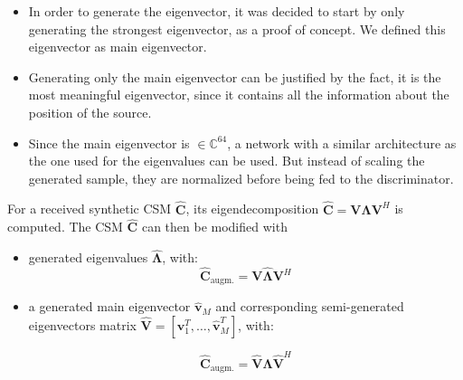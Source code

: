 \documentclass[12pt,pdftex,16x10]{elpres} %
\begin{document}
\begin{psli}
  \begin{itemize}
    \item In order to generate the eigenvector, it was decided to start by only generating the strongest eigenvector, as a proof of concept. We defined this eigenvector as main eigenvector.
    \item Generating only the main eigenvector can be justified by the fact, it is the most meaningful eigenvector, since it contains all the information about the position of the source. %
    \item Since the main eigenvector is $\in \mathbb{C}^{64}$, a network with a similar architecture as the one used for the eigenvalues can be used. But instead of scaling the generated sample, they are normalized before being fed to the discriminator. %
  \end{itemize}
\end{psli}

\begin{psli}
  
  For a received synthetic CSM $\mathbf{\hat{C}}$, its  eigendecomposition $\mathbf{\hat{C}} = \mathbf{V} \mathbf{\Lambda} \mathbf{V}^H$ is computed. The CSM $\mathbf{\hat{C}}$ can then be modified with
  
  \begin{itemize}
    \item generated eigenvalues $\hat{\mathbf{\Lambda}}$, with:
    \begin{equation}
        \mathbf{\hat{C}}_\text{augm.}  = \mathbf{V} \hat{\mathbf{\Lambda}} \mathbf{V}^H
    \end{equation}

    \item a generated main eigenvector $\hat{\mathbf{v}}_M$ and corresponding semi-generated eigenvectors matrix $\hat{\mathbf{V}} = [\mathbf{v}_1^T, \dots, \hat{\mathbf{v}}_M^T]$, with:

    \begin{equation}
        \mathbf{\hat{C}}_\text{augm.}  = \hat{\mathbf{V}} \mathbf{\Lambda} \hat{\mathbf{V}}^H
    \end{equation}

  \end{itemize}

\end{psli}
\end{document}
